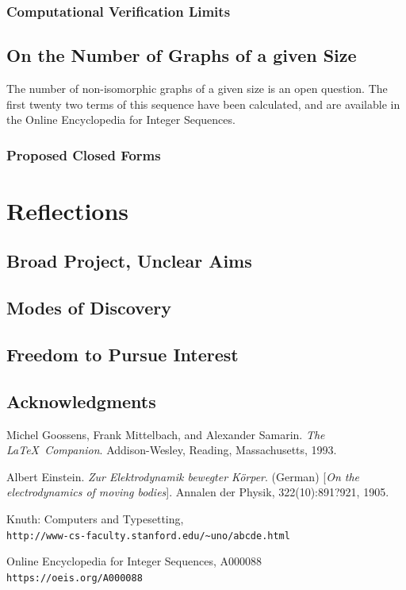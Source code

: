 \documentclass[11pt,a4paper]{report}
\begin{document}
\subsection{Computational Verification Limits}

\section{On the Number of Graphs of a given Size}
The number of non-isomorphic graphs of a given size is an open question.
The first twenty two terms of this sequence have been calculated, and are available in the Online Encyclopedia for Integer Sequences\cite{OEIS}.
\subsection{Proposed Closed Forms}



\chapter{Reflections}
\section{Broad Project, Unclear Aims}
\section{Modes of Discovery}
\section{Freedom to Pursue Interest}
\section{Acknowledgments}





\begin{thebibliography}{9}
Michel Goossens, Frank Mittelbach, and Alexander Samarin. 
\textit{The \LaTeX\ Companion}. 
Addison-Wesley, Reading, Massachusetts, 1993.
 
Albert Einstein. 
\textit{Zur Elektrodynamik bewegter K{\"o}rper}. (German) 
[\textit{On the electrodynamics of moving bodies}]. 
Annalen der Physik, 322(10):891?921, 1905.
 
Knuth: Computers and Typesetting,
\\\texttt{http://www-cs-faculty.stanford.edu/\~{}uno/abcde.html}


Online Encyclopedia for Integer Sequences, A000088
\\\texttt{https://oeis.org/A000088}


\end{thebibliography}
 
 
\end{document}

